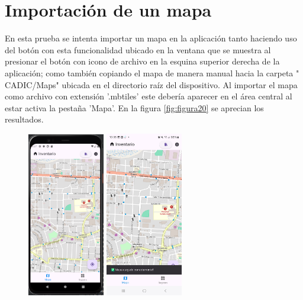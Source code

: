 \section{Importación de un mapa}
En esta prueba se intenta importar un mapa en la aplicación tanto haciendo uso del botón con esta funcionalidad ubicado en la ventana que se muestra al
presionar el botón con icono de archivo en la esquina superior derecha de la aplicación; como también copiando el mapa de manera manual
hacia la carpeta "$ $CADIC/Maps"$ $ ubicada en el directorio raíz del dispositivo. Al importar el mapa como archivo con extensión '.mbtiles' este debería
aparecer en el área central al estar activa la pestaña 'Mapa'. En la figura \ref{fig:figura20} se aprecian los resultados.
\begin{figure}[h]
    \includegraphics[width=0.3\textwidth]{Graphics/Capitulo 4/Pixel 4 [emulador]/4.2/1.png}
    \includegraphics[width=0.3\textwidth]{Graphics/Capitulo 4/Galaxy S23 Ultra Android/4.2/3.jpg}

\end{figure}
